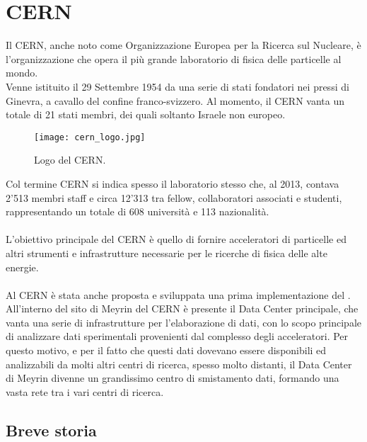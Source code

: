 \chapter{CERN} \label{chap:CERN}
	
	Il \ac{CERN}, anche noto come Organizzazione Europea per la Ricerca sul Nucleare, è l'organizzazione che opera il più grande laboratorio di fisica delle particelle al mondo.\\
	Venne istituito il 29 Settembre 1954 da una serie di stati fondatori nei pressi di Ginevra, a cavallo del confine franco-svizzero. Al momento, il CERN vanta un totale di 21 stati membri, dei quali soltanto Israele non europeo.\\
	
	\begin{figure}[h!]
		\begin{center}
			\texttt{[image: cern\_logo.jpg]}
		\end{center}
		\caption[Logo del CERN]{Logo del CERN.}
		\label{fig:cern_logo}
	\end{figure}
	\noindent
	Col termine \ac{CERN} si indica spesso il laboratorio stesso che, al 2013, contava 2'513 membri staff e circa 12'313 tra fellow, collaboratori associati e studenti, rappresentando un totale di 608 università e 113 nazionalità.\\
	\\
	L'obiettivo principale del \ac{CERN} è quello di fornire acceleratori di particelle ed altri strumenti e infrastrutture necessarie per le ricerche di fisica delle alte energie.\\
	\\
	Al \ac{CERN} è stata anche proposta e sviluppata una prima implementazione del . All'interno del sito di Meyrin del \ac{CERN} è presente il Data Center principale, che vanta una serie di infrastrutture per l'elaborazione di dati, con lo scopo principale di analizzare dati sperimentali provenienti dal complesso degli acceleratori. Per questo motivo, e per il fatto che questi dati dovevano essere disponibili ed analizzabili da molti altri centri di ricerca, spesso molto distanti, il Data Center di Meyrin divenne un grandissimo centro di smistamento dati, formando una vasta rete tra i vari centri di ricerca.
	
	\section{Breve storia} \label{sec:CERN;storia}
	
